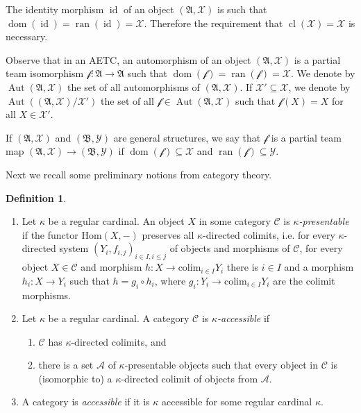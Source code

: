 \documentclass[a4paper]{amsart}
\theoremstyle{definition}
\newtheorem{definition}{Definition}[section]
\theoremstyle{remark}
\newcommand{\A}{\mathcal{A}}
\newcommand{\B}{\mathcal{B}}
\DeclareMathOperator{\dom}{dom}
\DeclareMathOperator{\ran}{ran}
\newcommand{\Hom}{\mathrm{Hom}}
\newcommand{\Y}{\mathcal{Y}}
\newcommand{\X}{\mathcal{X}}
\theoremstyle{definition}
\renewcommand{\A}{\mathfrak{A}}
\renewcommand{\B}{\mathfrak{B}}
\DeclareMathOperator{\id}{id}
\DeclareMathOperator{\Aut}{Aut}
\newcommand{\f}{\mathcal{f}}
\DeclareMathOperator{\cl}{cl}
\begin{document}
The identity morphism $\id$ of an object $(\A,\X)$ is such that $\dom(\id)=\ran(\id)=\X$. Therefore the requirement that $\cl(\X) = \X$ is necessary.

Observe that in an AETC, an automorphism of an object $(\A,\X)$ is a partial team isomorphism $\f\colon\A\to\A$ such that $\dom(\f)=\ran(\f)=\X$. We denote by $\Aut(\A,\X)$ the set of all automorphisms of $(\A,\X)$. If $\X'\subseteq\X$, we denote by $\Aut((\A,\X) / \X')$ the set of all $\f\in\Aut(\A,\X)$ such that $\f(X) = X$ for all $X\in\X'$.

If $(\A,\X)$ and $(\B,\Y)$ are general structures, we say that $\f$ is a partial team map $(\A,\X)\to(\B,\Y)$ if $\dom(\f)\subseteq\X$ and $\ran(\f)\subseteq\Y$.

Next we recall some preliminary notions from category theory.

\begin{definition}\quad
    \begin{enumerate}
        \item Let $\kappa$ be a regular cardinal. An object $X$ in some category $\mathcal C$ is \emph{$\kappa$-presentable} if the functor $\Hom(X,-)$ preserves all $\kappa$-directed colimits, i.e. for every $\kappa$-directed system $(Y_i,f_{i,j})_{i\in I, i\leq j}$ of objects and morphisms of $\mathcal C$, for every object $X\in\mathcal C$ and morphism $h\colon X\to\mathrm{colim}_{i\in I} Y_i$ there is $i\in I$ and a morphism $h_i\colon X\to Y_i$ such that $h = g_i\circ h_i$, where $g_i\colon Y_i\to\mathrm{colim}_{i\in I}Y_i$ are the colimit morphisms.
        \item Let $\kappa$ be a regular cardinal. A category $\mathcal C$ is \emph{$\kappa$-accessible} if
        \begin{enumerate}
            \item $\mathcal C$ has $\kappa$-directed colimits, and
            \item there is a set $\mathcal A$ of $\kappa$-presentable objects such that every object in $\mathcal C$ is (isomorphic to) a $\kappa$-directed colimit of objects from $\mathcal A$.
        \end{enumerate}
        \item A category is \emph{accessible} if it is $\kappa$ accessible for some regular cardinal $\kappa$.
    \end{enumerate}
\end{definition}
\end{document}
